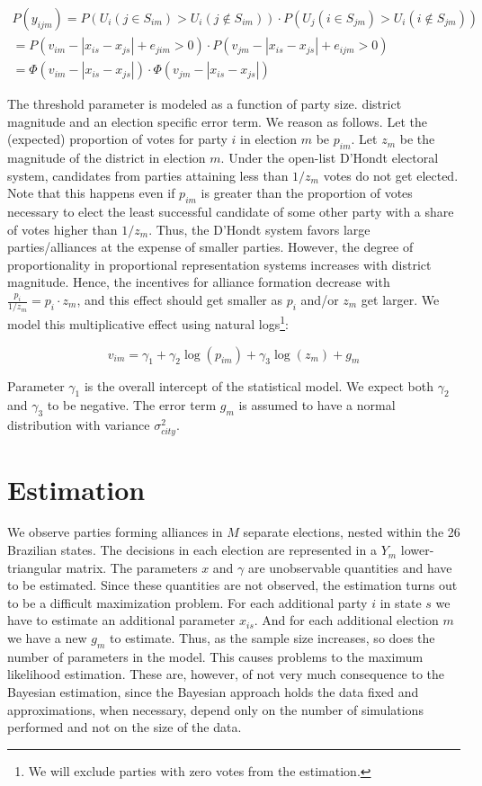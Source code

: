 \begin{eqnarray}
  \label{eq:ru1}
  P(y_{ijm})=P(U_i(j \in S_{im})>U_i(j\not \in S_{im})) \cdot P(U_j(i\in S_{jm})>U_i(i\not\in S_{jm}))\\
  =P(v_{im}-|x_{is}-x_{js}|+e_{jim}>0) \cdot P(v_{jm}-|x_{is}-x_{js}|+e_{ijm}>0) \\
  =\Phi(v_{im}-|x_{is}-x_{js}|) \cdot \Phi(v_{jm}-|x_{is}-x_{js}|)
\end{eqnarray}

The threshold parameter is modeled as a function of party size. district magnitude and an election specific error term. We reason as follows. Let the (expected) proportion of votes for party $i$ in election $m$ be $p_{im}$. Let $z_{m}$ be the magnitude of the district in election $m$. Under the open-list  D'Hondt electoral system, candidates  from parties attaining less than $1/z_{m}$ votes do not get elected. Note that this happens even if  $p_{im}$ is greater than the proportion of votes necessary to elect the least successful candidate of some other party with a share of votes higher  than $1/z_{m}$.  Thus, the  D'Hondt system favors large parties/alliances at the expense of smaller parties. However, the degree of proportionality in proportional representation systems increases with district magnitude. Hence, the incentives for alliance formation decrease with $\frac{p_i}{1/z_{m}}=p_i\cdot z_{m}$, and this effect should get smaller as $p_i$ and/or $z_{m}$ get larger. We model this multiplicative effect using natural logs\footnote{We will exclude parties with zero votes from the estimation.}:

\begin{equation}
  \label{eq:1}
  v_{im}=\gamma_1 +\gamma_2\log(p_{im})+\gamma_3 \log(z_m)+g_m
\end{equation}

Parameter $\gamma_1$ is the overall intercept of the statistical model. We expect both $\gamma_2$ and $\gamma_3$ to be negative. The error term $g_m$ is assumed to have a normal distribution with variance $\sigma_{city}^2$. 

\section{Estimation}

We observe parties forming alliances in  $M$ separate elections, nested within the 26 Brazilian states. The decisions in each election are represented in a  $Y_m$ lower-triangular matrix.  The parameters $x$ and $\gamma$ are unobservable quantities and have to be estimated.  Since these quantities are not observed,  the estimation turns out to be a difficult maximization problem.  For each additional party $i$ in state $s$ we have to estimate  an additional parameter  $x_{is}$. And for each additional election $m$ we have a new $g_m$ to estimate.  Thus, as the sample size increases, so does the number of parameters in the model. This causes problems to the maximum likelihood estimation.\citep[p.358]{clinton:2004} These are, however, of not very much consequence to the Bayesian estimation, since the Bayesian approach holds the data fixed and approximations, when necessary, depend only on the number of simulations performed and not on the size of the data.  

